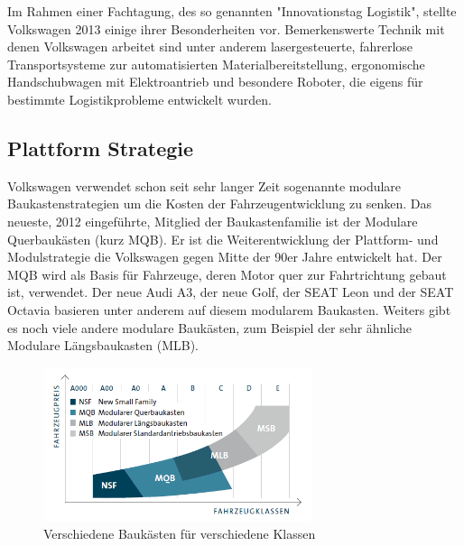 \documentclass[12pt]{article}
\begin{document}
Im Rahmen einer Fachtagung, des so genannten "Innovationstag Logistik", stellte Volkswagen 2013 einige ihrer Besonderheiten vor. Bemerkenswerte Technik mit denen Volkswagen arbeitet sind unter anderem lasergesteuerte, fahrerlose Transportsysteme zur automatisierten Materialbereitstellung, ergonomische Handschubwagen mit Elektroantrieb und besondere Roboter, die eigens für bestimmte Logistikprobleme entwickelt wurden.\cite{wolfsburg}
\subsection{Plattform Strategie}
Volkswagen verwendet schon seit sehr langer Zeit sogenannte modulare Baukastenstrategien um die Kosten der Fahrzeugentwicklung zu senken. Das neueste, 2012 eingeführte, Mitglied der Baukastenfamilie ist der Modulare Querbaukästen (kurz MQB). Er ist die Weiterentwicklung der Plattform- und Modulstrategie die Volkswagen gegen Mitte der 90er Jahre entwickelt hat. Der MQB wird als Basis für Fahrzeuge, deren Motor quer zur Fahrtrichtung gebaut ist, verwendet. Der neue Audi A3, der neue Golf, der SEAT Leon und der SEAT Octavia basieren unter anderem auf diesem modularem Baukasten. Weiters gibt es noch viele andere modulare Baukästen, zum Beispiel der sehr ähnliche Modulare Längsbaukasten (MLB).\cite{mqb}
\FloatBarrier
\begin{figure}[!h]
	\centering
	\includegraphics[width=0.7\textwidth]{images/MQB}
	\caption{Verschiedene Baukästen für verschiedene Klassen \cite{baukastengraph}}
\end{figure}\FloatBarrier\noindent
\end{document}
